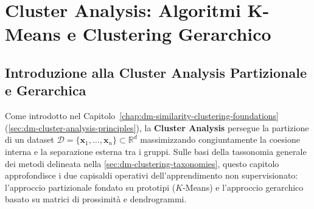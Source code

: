 \chapter{Cluster Analysis: Algoritmi K-Means e Clustering Gerarchico}
\label{chap:dm-kmeans-hierarchical}

\FloatBarrier
\section{Introduzione alla Cluster Analysis Partizionale e Gerarchica}
\label{sec:dm-clustering-intro-taxonomy}

Come introdotto nel Capitolo~\ref{chap:dm-similarity-clustering-foundations} (\autoref{sec:dm-cluster-analysis-principles}), la \textbf{Cluster Analysis} persegue la partizione di un dataset $\mathcal{D} = \{\mathbf{x}_1, \dots, \mathbf{x}_n\} \subset \mathbb{R}^d$ massimizzando congiuntamente la coesione interna e la separazione esterna tra i gruppi. Sulle basi della tassonomia generale dei metodi delineata nella \autoref{sec:dm-clustering-taxonomies}, questo capitolo approfondisce i due capisaldi operativi dell'apprendimento non supervisionato: l'approccio partizionale fondato su prototipi ($K$-Means) e l'approccio gerarchico basato su matrici di prossimità e dendrogrammi.

